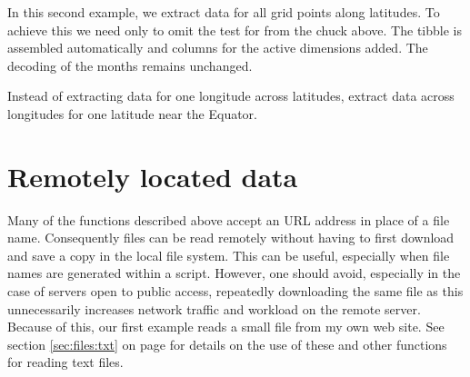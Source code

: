 \documentclass[krantz2]{krantz}\usepackage{knitr}
\begin{document}
In this second example, we extract data for all grid points along latitudes. To achieve this we need only to omit the test for  from the chuck above. The tibble is assembled automatically and columns for the active dimensions added. The decoding of the months remains unchanged.

\begin{knitrout}\footnotesize
{}\color{fgcolor}
\end{knitrout}

\begin{playground}
Instead of extracting data for one longitude across latitudes, extract data across longitudes for one latitude near the Equator.
\end{playground}

\section{Remotely located data}\label{sec:files:remote}

Many of the functions described above accept an URL address in place of a file name. Consequently files can be read remotely without having to first download and save a copy in the local file system. This can be useful, especially when file names are generated within a script. However, one should avoid, especially in the case of servers open to public access, repeatedly downloading the same file as this unnecessarily increases network traffic and workload on the remote server. Because of this, our first example reads a small file from my own web site. See section \ref{sec:files:txt} on page \pageref{sec:files:txt} for details on the use of these and other functions for reading text files.
\end{document}
